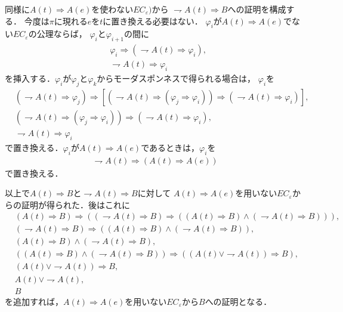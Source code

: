 	同様に$A(t) \Longrightarrow A(e)$を使わない$EC_{\varepsilon})$から
	$\rightharpoondown A(t) \Longrightarrow B$への証明を構成する．
	今度は$\pi$に現れる$e$を$t$に置き換える必要はない．
	$\varphi_{i}$が$A(t) \Longrightarrow A(e)$でない$EC_{\varepsilon}$の公理ならば，
	$\varphi_{i}$と$\varphi_{i+1}$の間に
	\begin{align}
		&\varphi_{i} \Longrightarrow (\rightharpoondown A(t) \Longrightarrow \varphi_{i}), \\
		&\rightharpoondown A(t) \Longrightarrow \varphi_{i}
	\end{align}
	を挿入する．$\varphi_{i}$が$\varphi_{j}$と$\varphi_{k}$からモーダスポンネスで得られる場合は，
	$\varphi_{i}$を
	\begin{align}
		&(\rightharpoondown A(t) \Longrightarrow \varphi_{j}) \Longrightarrow
		[(\rightharpoondown A(t) \Longrightarrow 
		(\varphi_{j}\Longrightarrow \varphi_{i}))
		\Longrightarrow (\rightharpoondown A(t) \Longrightarrow \varphi_{i})], \\
		&(\rightharpoondown A(t) \Longrightarrow 
		(\varphi_{j} \Longrightarrow \varphi_{i}))
		\Longrightarrow (\rightharpoondown A(t) \Longrightarrow \varphi_{i}), \\
		&\rightharpoondown A(t) \Longrightarrow \varphi_{i}
	\end{align}
	で置き換える．$\varphi_{i}$が$A(t) \Longrightarrow A(e)$であるときは，$\varphi_{i}$を
	\begin{align}
		\rightharpoondown A(t) \Longrightarrow (A(t) \Longrightarrow A(e))
	\end{align}
	で置き換える．
	
	以上で$A(t) \Longrightarrow B$と$\rightharpoondown A(t) \Longrightarrow B$に対して
	$A(t) \Longrightarrow A(e)$を用いない$EC_{\varepsilon}$からの証明が得られた．後はこれに
	\begin{align}
		&(A(t) \Longrightarrow B) \Longrightarrow
		((\rightharpoondown A(t) \Longrightarrow B) \Longrightarrow
		((A(t) \Longrightarrow B) \wedge (\rightharpoondown A(t) \Longrightarrow B))), \\
		&(\rightharpoondown A(t) \Longrightarrow B) \Longrightarrow
		((A(t) \Longrightarrow B) \wedge (\rightharpoondown A(t) \Longrightarrow B)), \\
		&(A(t) \Longrightarrow B) \wedge (\rightharpoondown A(t) \Longrightarrow B), \\
		&((A(t) \Longrightarrow B) \wedge (\rightharpoondown A(t) \Longrightarrow B))
		\Longrightarrow ((A(t) \vee \rightharpoondown A(t)) \Longrightarrow B), \\
		&(A(t) \vee \rightharpoondown A(t)) \Longrightarrow B, \\
		&A(t) \vee \rightharpoondown A(t), \\
		&B
	\end{align}
	を追加すれば，$A(t) \Longrightarrow A(e)$を用いない$EC_{\varepsilon}$から$B$への証明となる．
	